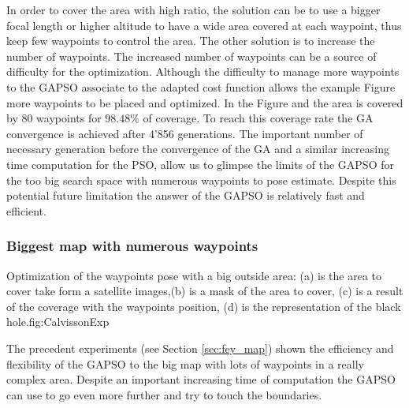 In order to cover the area with high ratio, the solution can be to use a bigger focal length or higher altitude to have a wide area covered at each waypoint, thus keep few waypoints to control the area. The other solution is to increase the number of waypoints. The increased number of waypoints can be a source of difficulty for the optimization. Although the difficulty to manage more waypoints  to the GAPSO associate to the adapted cost function allows the example Figure  more waypoints to be placed and optimized. 
 In the Figure  and  the area is covered by 80 waypoints for $98.48\%$ of coverage. To reach this coverage rate the GA convergence is achieved after 4'856 generations. The important number of necessary generation before the convergence of the GA and a similar  increasing time computation for the PSO, allow us to glimpse the limits of the GAPSO for the too big search space with numerous waypoints to pose estimate. Despite this potential future limitation the answer of the GAPSO is relatively fast and efficient.\\
 

		\subsubsection{Biggest map with numerous waypoints}\label{sec:biggestMapcalWaypoint}
\begin{mfigures}[!]{Optimization of the waypoints pose with a big outside area: (a) is the area to cover take form a satellite images,(b) is a mask of the area to cover, (c) is a result of the coverage with the waypoints position, (d) is the representation of the black hole.}{fig:CalvissonExp} \centering
{}
\hspace{1cm}
\hspace{1cm}
\tabsimuposeCalvisson
\end{mfigures}	

The precedent experiments (see Section \ref{sec:fey_map}) shown the efficiency and flexibility of the GAPSO to the big map with lots of waypoints in a really complex area. Despite an important increasing time of computation the GAPSO can use to go even more further and try to touch the boundaries.  

